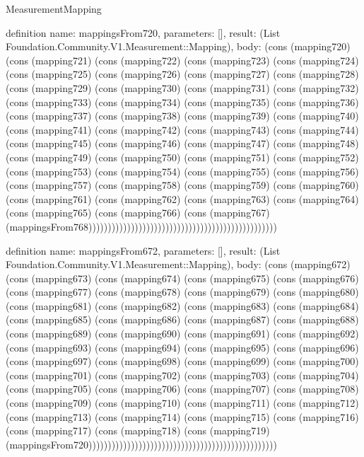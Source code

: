 \begin{lexlean}{MeasurementMapping}
\begin{semanticmodule}
definition{
  name: mappingsFrom720,
  parameters: [],
  result: (List Foundation.Community.V1.Measurement::Mapping),
  body: (cons (mapping720) (cons (mapping721) (cons (mapping722) (cons (mapping723) (cons (mapping724) (cons (mapping725) (cons (mapping726) (cons (mapping727) (cons (mapping728) (cons (mapping729) (cons (mapping730) (cons (mapping731) (cons (mapping732) (cons (mapping733) (cons (mapping734) (cons (mapping735) (cons (mapping736) (cons (mapping737) (cons (mapping738) (cons (mapping739) (cons (mapping740) (cons (mapping741) (cons (mapping742) (cons (mapping743) (cons (mapping744) (cons (mapping745) (cons (mapping746) (cons (mapping747) (cons (mapping748) (cons (mapping749) (cons (mapping750) (cons (mapping751) (cons (mapping752) (cons (mapping753) (cons (mapping754) (cons (mapping755) (cons (mapping756) (cons (mapping757) (cons (mapping758) (cons (mapping759) (cons (mapping760) (cons (mapping761) (cons (mapping762) (cons (mapping763) (cons (mapping764) (cons (mapping765) (cons (mapping766) (cons (mapping767) (mappingsFrom768)))))))))))))))))))))))))))))))))))))))))))))))))
}

definition{
  name: mappingsFrom672,
  parameters: [],
  result: (List Foundation.Community.V1.Measurement::Mapping),
  body: (cons (mapping672) (cons (mapping673) (cons (mapping674) (cons (mapping675) (cons (mapping676) (cons (mapping677) (cons (mapping678) (cons (mapping679) (cons (mapping680) (cons (mapping681) (cons (mapping682) (cons (mapping683) (cons (mapping684) (cons (mapping685) (cons (mapping686) (cons (mapping687) (cons (mapping688) (cons (mapping689) (cons (mapping690) (cons (mapping691) (cons (mapping692) (cons (mapping693) (cons (mapping694) (cons (mapping695) (cons (mapping696) (cons (mapping697) (cons (mapping698) (cons (mapping699) (cons (mapping700) (cons (mapping701) (cons (mapping702) (cons (mapping703) (cons (mapping704) (cons (mapping705) (cons (mapping706) (cons (mapping707) (cons (mapping708) (cons (mapping709) (cons (mapping710) (cons (mapping711) (cons (mapping712) (cons (mapping713) (cons (mapping714) (cons (mapping715) (cons (mapping716) (cons (mapping717) (cons (mapping718) (cons (mapping719) (mappingsFrom720)))))))))))))))))))))))))))))))))))))))))))))))))
}


\end{semanticmodule}
\end{lexlean}
